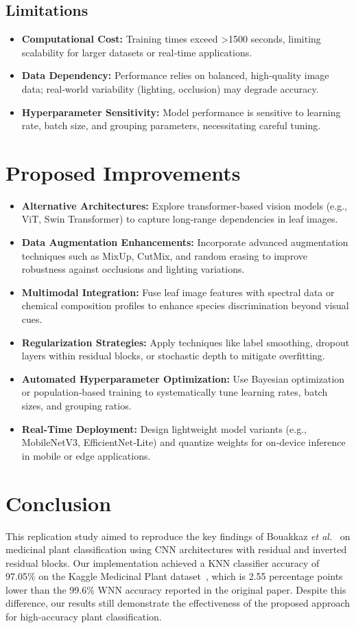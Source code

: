 \documentclass[journal,onecolumn]{IEEEtran}
\begin{document}
\subsection{Limitations}
\begin{itemize}
  \item \textbf{Computational Cost:} Training times exceed >1500 seconds, limiting scalability for larger datasets or real‑time applications.
  \item \textbf{Data Dependency:} Performance relies on balanced, high‑quality image data; real‑world variability (lighting, occlusion) may degrade accuracy.
  \item \textbf{Hyperparameter Sensitivity:} Model performance is sensitive to learning rate, batch size, and grouping parameters, necessitating careful tuning.
\end{itemize}


\section{Proposed Improvements}
\begin{itemize}
  \item \textbf{Alternative Architectures:} Explore transformer‑based vision models (e.g., ViT, Swin Transformer) to capture long‑range dependencies in leaf images.
  \item \textbf{Data Augmentation Enhancements:} Incorporate advanced augmentation techniques such as MixUp, CutMix, and random erasing to improve robustness against occlusions and lighting variations.
  \item \textbf{Multimodal Integration:} Fuse leaf image features with spectral data or chemical composition profiles to enhance species discrimination beyond visual cues.
  \item \textbf{Regularization Strategies:} Apply techniques like label smoothing, dropout layers within residual blocks, or stochastic depth to mitigate overfitting.
  \item \textbf{Automated Hyperparameter Optimization:} Use Bayesian optimization or population‑based training to systematically tune learning rates, batch sizes, and grouping ratios.
  \item \textbf{Real‑Time Deployment:} Design lightweight model variants (e.g., MobileNetV3, EfficientNet‑Lite) and quantize weights for on‑device inference in mobile or edge applications.
\end{itemize}


\section{Conclusion}
This replication study aimed to reproduce the key findings of Bouakkaz \textit{et al.}~\cite{Bouakkaz2025} on medicinal plant classification using CNN architectures with residual and inverted residual blocks. Our implementation achieved a KNN classifier accuracy of 97.05\% on the Kaggle Medicinal Plant dataset~\cite{KaggleDataset}, which is 2.55 percentage points lower than the 99.6\% WNN accuracy reported in the original paper. Despite this difference, our results still demonstrate the effectiveness of the proposed approach for high-accuracy plant classification.
\end{document}
